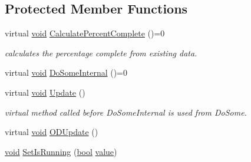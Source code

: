 \subsection*{Protected Member Functions}
\begin{DoxyCompactItemize}
\item 
virtual \hyperlink{sound_8c_ae35f5844602719cf66324f4de2a658b3}{void} \hyperlink{class_o_d_task_abbe5b9fc9d3dd4420876ac1364980ca2}{Calculate\+Percent\+Complete} ()=0
\begin{DoxyCompactList}\small\item\em calculates the percentage complete from existing data. \end{DoxyCompactList}\item 
virtual \hyperlink{sound_8c_ae35f5844602719cf66324f4de2a658b3}{void} \hyperlink{class_o_d_task_a45888cf5d09536d7e600f5c6afeb65f1}{Do\+Some\+Internal} ()=0
\item 
virtual \hyperlink{sound_8c_ae35f5844602719cf66324f4de2a658b3}{void} \hyperlink{class_o_d_task_a6348e90d6b64fd775ca020e69705d7aa}{Update} ()
\begin{DoxyCompactList}\small\item\em virtual method called before Do\+Some\+Internal is used from Do\+Some. \end{DoxyCompactList}\item 
virtual \hyperlink{sound_8c_ae35f5844602719cf66324f4de2a658b3}{void} \hyperlink{class_o_d_task_a441c889eed01e475ca55b8a6e6d8e100}{O\+D\+Update} ()
\item 
\hyperlink{sound_8c_ae35f5844602719cf66324f4de2a658b3}{void} \hyperlink{class_o_d_task_ac018f7c48b1eb6a096dba290b9c0c7b2}{Set\+Is\+Running} (\hyperlink{mac_2config_2i386_2lib-src_2libsoxr_2soxr-config_8h_abb452686968e48b67397da5f97445f5b}{bool} \hyperlink{lib_2expat_8h_a4a30a13b813682e68c5b689b45c65971}{value})
\end{DoxyCompactItemize}
